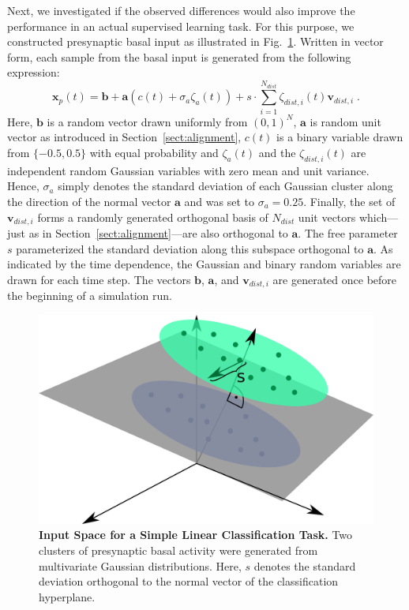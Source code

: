 \documentclass[10pt,a4paper,twocolumn]{article}
\begin{document}
		Next, we investigated if the observed differences would also improve
		the performance in an actual supervised learning task.
		For this purpose, we constructed presynaptic basal input as illustrated
		in Fig.~\ref{fig:illustration_classification}.
		Written in vector form,
		each sample from the basal input is generated from the following expression:
		\begin{equation}
			\mathbf{x}_p(t) = \mathbf{b} + \mathbf{a}\left(c(t) + \sigma_a \zeta_a(t) \right) 
			+ s \cdot \sum_{i=1}^{N_{dist}} \zeta_{dist,i}(t) \mathbf{v}_{dist,i} \; .
		\end{equation}
		Here, $\mathbf{b}$ is a random vector drawn uniformly from
		$(0,1)^N$, $\mathbf{a}$ is random unit vector as introduced in 
		Section~\ref{sect:alignment}, $c(t)$ is a binary variable drawn 
		from $\{-0.5,0.5\}$ with equal probability and $\zeta_a(t)$ and the
		$\zeta_{dist,i}(t)$ are independent random Gaussian variables with 
		zero mean and unit variance. 
		Hence, $\sigma_a$ simply denotes the standard deviation of each Gaussian
		cluster along the direction of the normal vector $\mathbf{a}$ and was
		set to $\sigma_a = 0.25$. 
		Finally, the set of $\mathbf{v}_{dist,i}$ forms a randomly generated
		orthogonal basis of $N_{dist}$ unit vectors which---just as in 
		Section~\ref{sect:alignment}---are also orthogonal to $\mathbf{a}$.
		The free parameter $s$ parameterized
		the standard deviation along this subspace orthogonal to $\mathbf{a}$.
		As indicated by the time dependence, the Gaussian and binary random
		variables are drawn for each time step. The vectors
		$\mathbf{b}$, $\mathbf{a}$, and $\mathbf{v}_{dist,i}$ are generated
		once before the beginning of a simulation run.
		\begin{figure}
			\centering
			\includegraphics[width=0.75\columnwidth]{illustration_classification}
			\caption{{\bf Input Space for a Simple Linear Classification Task.}
				Two clusters of presynaptic basal activity were generated from 
				multivariate Gaussian distributions. Here, $s$ denotes the standard
				deviation orthogonal to the normal vector of the classification
				hyperplane.}
			\label{fig:illustration_classification}
		\end{figure}
		
\end{document}
